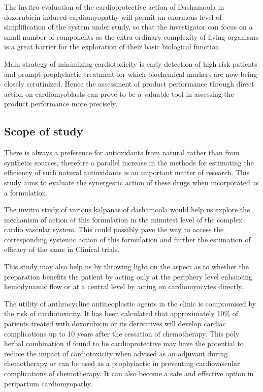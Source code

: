 \documentclass[11pt]{article} %
\begin{document}
The invitro evaluation of the cardioprotective action of Dashamoola in doxorubicin
induced cardiomyopathy will permit an enormous level of simplification of the system under
study, so that the investigator can focus on a small number of components as the extra ordinary
complexity of living organisms is a great barrier for the exploration of their basic biological
function.

Main strategy of minimizing cardiotoxicity is early detection of high risk patients and
prompt prophylactic treatment for which biochemical markers are now being closely scrutinized.
Hence the assessment of product performance through direct action on cardiomyoblasts can
prove to be a valuable tool in assessing the product performance more precisely.

\subsection{Scope of study}
\label{subsec:scope}

There is always a preference for antioxidants from natural rather than from synthetic
sources, therefore a parallel increase in the methods for estimating the efficiency of such natural antioxidants is an important matter of research. This study aims to evaluate the synergestic action of these drugs when incorporated as a formulation.

The invitro study of various kalpanas of dashamoola would help us explore the
mechanism of action of this formulation in the minutest level of the complex cardio vascular
system. This could possibly pave the way to access the corresponding systemic action of this
formulation and further the estimation of efficacy of the same in Clinical trials.

This study may also help us by throwing light on the aspect as to whether the preparation
benefits the patient by acting only at the periphery level enhancing hemodynamic flow or at a
central level by acting on cardiomyocytes directly.

The utility of anthracycline antineoplastic agents in the clinic is compromised by the risk
of cardiotoxicity. It has been calculated that approximately 10\% of patients treated with
doxorubicin or its derivatives will develop cardiac complications up to 10 years after the
cessation of chemotherapy. This poly herbal combination if found to be cardioprotective may
have the potential to reduce the impact of cardiotoxicity when advised as an adjuvant during
chemotherapy or can be used as a prophylactic in preventing cardiovascular complications of
chemotherapy. It can also become a safe and effective option in peripartum cardiomyopathy.
\end{document}
